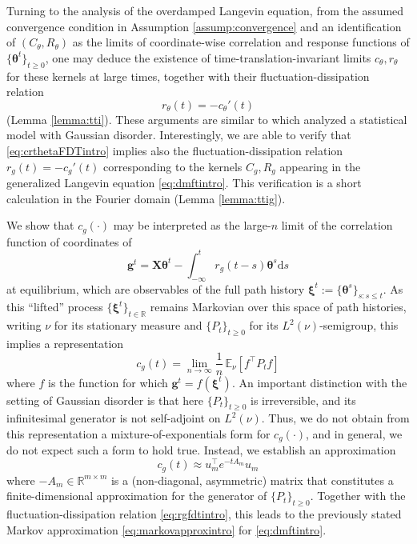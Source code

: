 \documentclass[11pt,letterpaper,reqno]{amsart}
\def\E{\mathbb{E}}
\def\R{\mathbb{R}}
\def\d{\mathrm{d}}
\def\btheta{\boldsymbol{\theta}}
\def\bxi{\boldsymbol{\xi}}
\def\X{\mathbf{X}}
\def\g{\mathbf{g}}
\theoremstyle{definition}
\numberwithin{equation}{section}
\begin{document}
Turning to the analysis of the overdamped
Langevin equation, from the
assumed convergence condition in Assumption \ref{assump:convergence} and an
identification of $(C_\theta,R_\theta)$ as the limits of
coordinate-wise correlation and response functions of
$\{\btheta^t\}_{t \geq 0}$, one may deduce the existence of
time-translation-invariant limits $c_\theta,r_\theta$ for these kernels at
large times, together with their fluctuation-dissipation relation
\begin{equation}\label{eq:crthetaFDTintro}
r_\theta(t)={-}c_\theta'(t)
\end{equation}
(Lemma \ref{lemma:tti}). 
These arguments are similar to \cite{fan2025dynamicalII} which analyzed a statistical model with Gaussian disorder.
Interestingly, we are able to verify that \eqref{eq:crthetaFDTintro}
implies also the fluctuation-dissipation relation
$r_g(t)={-}c_g'(t)$ corresponding to the kernels
$C_g,R_g$ appearing in the generalized Langevin
equation \eqref{eq:dmftintro}. This verification is a short
calculation in the Fourier domain (Lemma \ref{lemma:ttig}).

We show that $c_g(\cdot)$ may be interpreted as
the large-$n$ limit of the correlation function of coordinates of
\[\g^t=\X \btheta^t - \int_{-\infty}^t r_g(t-s)\btheta^s\d s\]
at equilibrium, which are observables of the full path history
$\bxi^t:=\{\btheta^s\}_{s:s \leq t}$.
As this ``lifted'' process $\{\bxi^t\}_{t \in \R}$ remains Markovian over this
space of path histories, writing $\nu$ for its stationary measure
and $\{P_t\}_{t \geq 0}$ for its
$L^2(\nu)$-semigroup, this implies a representation
\[c_g(t)=\lim_{n \to \infty} \frac{1}{n}\,\E_\nu[f^\top P_t f]\]
where $f$ is the function for which $\g^t=f(\bxi^t)$.
An important distinction with the setting of Gaussian disorder is that here
$\{P_t\}_{t \geq 0}$ is irreversible, and its infinitesimal generator is not
self-adjoint on $L^2(\nu)$. Thus, we do not obtain from this representation a
mixture-of-exponentials form for $c_g(\cdot)$, and in general, we do not expect
such a form to hold true. Instead, we establish an approximation
\[c_g(t) \approx u_m^\top e^{-tA_m}u_m\]
where ${-}A_m \in \R^{m \times m}$ is a (non-diagonal, asymmetric)
matrix that constitutes a finite-dimensional 
approximation for the generator of $\{P_t\}_{t \geq 0}$.
Together with the fluctuation-dissipation
relation \eqref{eq:rgfdtintro}, this leads to the previously stated Markov
approximation \eqref{eq:markovapproxintro} for \eqref{eq:dmftintro}.
\end{document}
